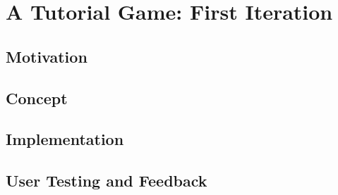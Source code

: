 \chapter{A Tutorial Game: First Iteration}
\label{ch:tutorial_game}

\section{Motivation}
\label{sec:game_motivation}


\section{Concept}
\label{sec:game_concept}


\section{Implementation}
\label{sec:game_implementation}


\section{User Testing and Feedback}
\label{sec:game_testing}